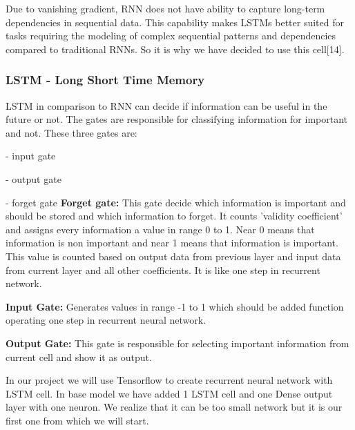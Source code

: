 \documentclass{article}
\begin{document}
\begin{flushleft}
\begin{justify}
Due to vanishing gradient, RNN does not have ability to capture long-term dependencies in sequential data. This capability makes LSTMs better suited for tasks requiring the modeling of complex sequential patterns and dependencies compared to traditional RNNs. So it is why we have decided to use this cell[14].

\subsubsection{LSTM - Long Short Time Memory}

LSTM in comparison to RNN can decide if information can be useful in the future or not. The gates are responsible for classifying information for important and not. These three gates are:

- input gate

- output gate

- forget gate
\vspace{1em}
\textbf{Forget gate:} This gate decide which information is important and should be stored and which information to forget. It counts 'validity coefficient' and  assigns every information a value in range 0 to 1. Near 0 means that information is non important and near 1 means that information is important. This value is counted based on output data from previous layer and input data from current layer and all other coefficients. It is like one step in recurrent network.

\textbf{Input Gate:} Generates values in range -1 to 1 which should be added function operating one step in recurrent neural network.

\textbf{Output Gate:}  This gate is responsible for selecting important information from current cell and show it as output.

\vspace{1em}

In our project we will use Tensorflow to create recurrent neural network with LSTM cell. In base model we have added 1 LSTM cell and one Dense output layer with one neuron. We realize that it can be too small network but it is our first one from which we will start.




\end{justify}
\end{flushleft}
\end{document}

